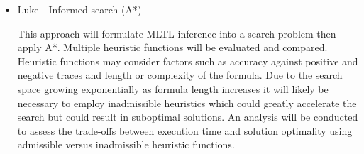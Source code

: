 \documentclass[12pt]{article}
\begin{document}
\begin{itemize}
\item Luke - Informed search (A*)

This approach will formulate MLTL inference into a search problem then apply A*.  Multiple heuristic functions will be evaluated and compared.  Heuristic functions may consider factors such as accuracy against positive and negative traces and length or complexity of the formula.  Due to the search space growing exponentially as formula length increases it will likely be necessary to employ inadmissible heuristics which could greatly accelerate the search but could result in suboptimal solutions.  An analysis will be conducted to assess the trade-offs between execution time and solution optimality using admissible versus inadmissible heuristic functions.

\end{itemize} 

\newpage
\end{document}
